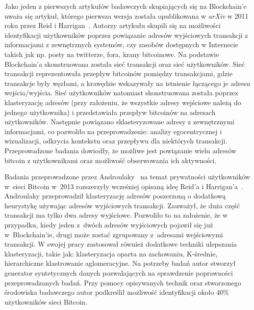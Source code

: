 \documentclass[12pt, oneside, final, openany]{mgr}
\begin{document}
\indent Jako jeden z pierwszych artykułów badawczych skupiających się na Blockchain'e uważa się artykuł, którego pierwsza wersja została opublikowana w \textit{arXiv} w 2011 roku przez Reid i Harrigan~\cite{Reid2013}. Autorzy artykułu skupili się na możliwości identyfikacji użytkowników poprzez powiązanie adresów wyjściowych transakcji z informacjami z zewnętrznych systemów, czy zasobów dostępnych w Internecie takich jak np. posty na twitterze, fora, krany bitcoinowe. Na podstawie Blockchain'a skonstruowana została sieć transakcji oraz sieć użytkowników. Sieć transakcji reprezentowała przepływ bitcoinów pomiędzy transakcjami, gdzie transakcje były węzłami, a krawędzie wskazywały na istnienie łączącego je adresu wejścia/wyjścia. Sieć użytkowników natomiast skonstruowana została poprzez klasteryzację adresów (przy założeniu, że wszystkie adresy wejściowe należą do jednego użytkownika) i przedstawiała przepływ bitcoinów na adresach użytkowników. Następnie powiązano sklasteryzowane adresy z zewnętrznymi informacjami, co pozwoliło na przeprowadzenie: analizy egocentrycznej i wizualizacji, odkrycia kontekstu oraz przepływu dla niektórych transakcji. Przeprowadzone badania dowiodły, że możliwe jest powiązanie wielu adresów bitcoin z  użytkownikami oraz możliwość obserwowania ich aktywności.

\indent Badania przeprowadzone przez Androulaky~\cite{Androulaki2013} na temat prywatności użytkowników w~sieci Bitcoin w~2013 rozszerzyły wcześniej opisaną ideę Reid'a i Harrigan'a~\cite{Reid2013}. Androulaky przeprowadził klasteryzację adresów poszerzoną o dodatkową heurystykę używając adresów wyjściowych transakcji. Zauważył, że duża część transakcji ma tylko dwa adresy wyjściowe. Pozwoliło to na założenie, że w przypadku, kiedy jeden z~dwóch adresów wyjściowych pojawił się już w~Blockchain'ie, drugi może zostać zgrupowany z~adresami wejściowymi transakcji. W swojej pracy zastosował również dodatkowe techniki ulepszania klasteryzacji, takie jak: klasteryzacja oparta na zachowaniu, K-średnie, hierarchiczne klastrowanie aglomeracyjne. Na potrzeby badań autor stworzył generator syntetycznych danych pozwalających na sprawdzenie poprawności przeprowadzanych badań. Przy pomocy opisywanych technik oraz stworzonego środowiska badawczego autor podkreślił możliwość identyfikacji około $40\%$ użytkowników sieci Bitcoin. 
\end{document}
